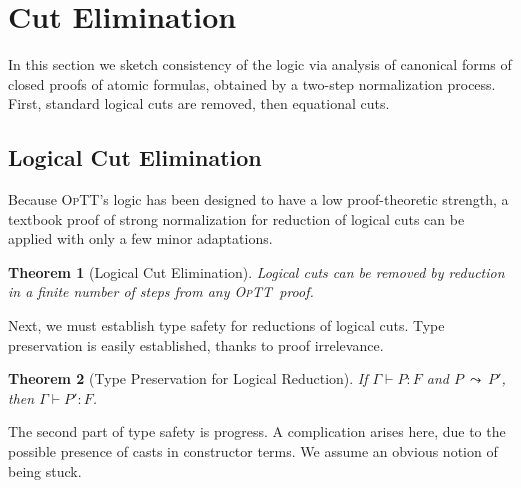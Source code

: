 \documentclass[preprint,natbib]{sigplanconf}
\newcommand{\seq}[3]{#1 \vdash #2 : #3}
\newcommand{\optt}{\textsc{OpTT}}
\newtheorem{theorem}{Theorem}
\newtheorem{lemma}{Lemma}
\begin{document}
\section{Cut Elimination}
\label{sec:cut_elim}

In this section we sketch consistency of the logic via analysis of
canonical forms of closed proofs of atomic formulas, obtained by a
two-step normalization process.  First, standard logical cuts are
removed, then equational cuts.

\subsection{Logical Cut Elimination}
\label{sec:lce}

Because \optt's logic has been designed to have a low proof-theoretic
strength, a textbook proof of strong normalization for reduction of
logical cuts can be applied with only a few minor adaptations.  

\begin{theorem}[Logical Cut Elimination]
Logical cuts can be removed by reduction in a finite number of steps
from any \optt\ proof.
\end{theorem}

Next, we must establish type safety for reductions of logical cuts.
Type preservation is easily established, thanks to proof irrelevance.

\begin{theorem}[Type Preservation for Logical Reduction]
If $\seq{\Gamma}{P}{F}$ and $P\ \leadsto\ P'$, then $\seq{\Gamma}{P'}{F}$.
\end{theorem}

%
%

The second part of type safety is progress.  A complication arises
here, due to the possible presence of casts in constructor terms.  We
assume an obvious notion of being stuck.
\end{document}
